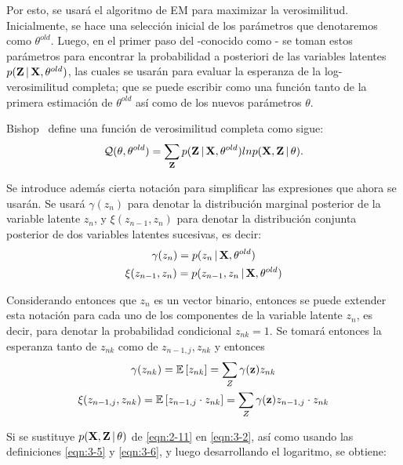 Por esto, se usará el algoritmo de \ac{EM} para maximizar la verosimilitud. Inicialmente, se hace una selección inicial de los parámetros que denotaremos como $\theta^{old}$. Luego, en el primer paso del \aem -conocido como \estep- se toman estos parámetros para encontrar la probabilidad a posteriori de las variables latentes $p(\textbf{Z} \,|\, \textbf{X}, \theta^{old})$, las cuales se usarán para evaluar la esperanza de la log-verosimilitud completa; que se puede escribir como una función tanto de la primera estimación de $\theta^{old}$ así como de los nuevos parámetros $\theta$.

Bishop~\cite{Bishop2006} define una función de verosimilitud completa como sigue:
\begin{equation}
\mathcal{Q}(\theta, \theta^{old}) = 
  \sum_{\textbf{Z}} p(\textbf{Z} \,|\, \textbf{X}, \theta^{old})
  ln p(\textbf{X}, \textbf{Z} \,|\, \theta).
\label{eqn:3-2}
\end{equation}

Se introduce además cierta notación para simplificar las expresiones que ahora se usarán. Se usará $\gamma(z_n)$ para denotar la distribución marginal posterior de la variable latente $z_n$, y $\xi(z_{n-1}, z_n)$ para denotar la distribución conjunta posterior de dos variables latentes sucesivas, es decir: 
\begin{gather}
\gamma(z_n) = p(z_n \,|\, \textbf{X}, \theta^{old}) \label{eqn:3-3} \\
\xi(z_{n-1}, z_n) = p(z_{n-1}, z_n \,|\, \textbf{X}, \theta^{old}) \label{eqn:3-4}
\end{gather}

Considerando entonces que $z_n$ es un vector binario, entonces se puede extender esta notación para cada uno de los componentes de la variable latente $z_n$, es decir, para denotar la probabilidad condicional $z_{nk} = 1$. Se
tomará entonces la esperanza tanto de $z_{nk}$ como de $z_{n-1, j}, z_{nk}$ y entonces
\begin{gather}
\gamma(z_{nk}) = \mathbb{E} \left[ z_{nk} \right] = \sum_Z  \gamma(\textbf{z}) z_{nk} \label{eqn:3-5} \\
\xi(z_{n-1,j}, z_{nk}) = \mathbb{E} \left[z_{n-1, j} \cdot z_{nk} \right] = \sum_Z  \gamma(\textbf{z}) z_{n-1, j} 
\cdot z_{nk}
\label{eqn:3-6}
\end{gather}

Si se sustituye $p(\textbf{X}, \textbf{Z} \,|\, \theta)$ de \eqref{eqn:2-11} en \eqref{eqn:3-2}, así como usando las definiciones \eqref{eqn:3-5} y \eqref{eqn:3-6}, y luego desarrollando el logaritmo, se obtiene: 

